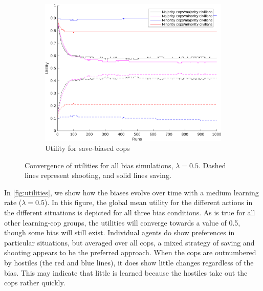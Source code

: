\begin{figure}[H]
    \begin{subfigure}[b]{0.62\textwidth}
        \includegraphics[width=\textwidth]{./pictures/Utility05BiasSave}
        \caption{Utility for save-biased cops }
        \label{fig:utSave}
    \end{subfigure}
\caption{Convergence of utilities for all bias simulations, $\lambda = 0.5$. Dashed lines represent shooting, and solid lines saving. }
\label{fig:utilities}
\end{figure}
In \autoref{fig:utilities}, we show how the biases evolve over time with a medium learning rate ($\lambda = 0.5$). In this figure, the global mean utility for the different actions in the different situations is depicted for all three bias conditions. As is true for all other learning-cop groups, the utilities will converge towards a value of 0.5, though some bias will still exist. Individual agents do show preferences in particular situations, but averaged over all cops, a mixed strategy of saving and shooting appears to be the preferred approach. When the cops are outnumbered by hostiles (the red and blue lines), it does show little changes regardless of the bias. This may indicate that little is learned because the hostiles take out the cops rather quickly. 


